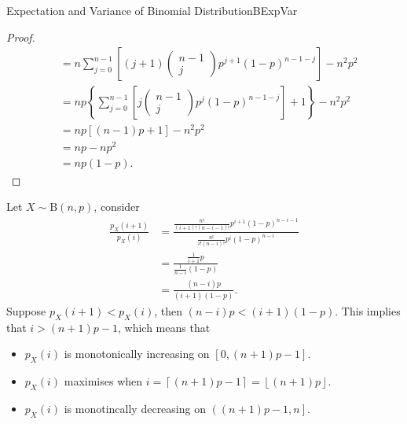 \documentclass[math]{amznotes}
\theoremstyle{remark}
\newcommand{\0}{\mathbf{0}}
\newcommand{\1}{\mathbf{1}}
\begin{document}
\begin{probox}{Expectation and Variance of Binomial Distribution}{BExpVar}
\begin{proof}
\begin{align*}
            & = n\sum_{j = 0}^{n - 1}\left[(j + 1)\begin{pmatrix}
                n - 1 \\
                j
            \end{pmatrix}p^{j + 1}(1 - p)^{n - 1 - j}\right] - n^2p^2 \\
            & = np\left\{\sum_{j = 0}^{n - 1}\left[j\begin{pmatrix}
                n - 1 \\
                j
            \end{pmatrix}p^j(1 - p)^{n - 1 - j}\right] + 1\right\} - n^2p^2 \\
            & = np\left[(n - 1)p + 1\right] - n^2p^2 \\
            & = np - np^2 \\
            & = np(1 - p).
        \end{align*}
    \end{proof}
\end{probox}
Let $X \sim \mathrm{B}(n, p)$, consider
\begin{align*}
    \frac{p_X(i + 1)}{p_X(i)} & = \frac{\frac{n!}{(i + 1)!(n - i - 1)!}p^{i + 1}(1 - p)^{n - i - 1}}{\frac{n!}{i!(n - i)!}p^i(1 - p)^{n - i}} \\
    & = \frac{\frac{1}{i + 1}p}{\frac{1}{n - i}(1 - p)} \\
    & = \frac{(n - i)p}{(i + 1)(1 - p)}.
\end{align*}
Suppose $p_X(i + 1) < p_X(i)$, then $(n - i)p < (i + 1)(1 - p)$. This implies that $i > (n + 1)p - 1$, which means that
\begin{itemize}
    \item $p_X(i)$ is monotonically increasing on $\left[0, (n + 1)p - 1\right]$.
    \item $p_X(i)$ maximises when $i = \left\lceil (n + 1)p - 1 \right\rceil = \left\lfloor (n + 1)p \right\rfloor$.
    \item $p_X(i)$ is monotincally decreasing on $\left((n + 1)p - 1, n\right]$.
\end{itemize}
\end{document}
